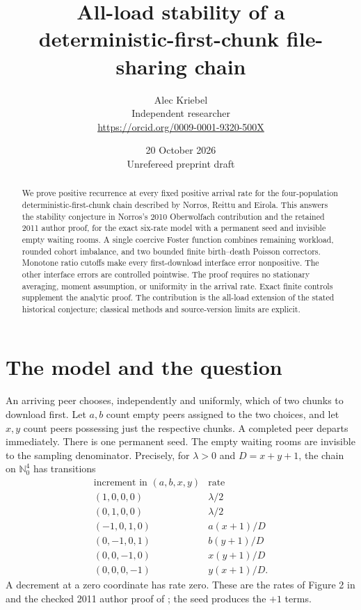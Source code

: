 \documentclass[11pt]{article}
\title{All-load stability of a deterministic-first-chunk file-sharing chain}
\author{Alec Kriebel\\Independent researcher\\
\small\url{https://orcid.org/0009-0001-9320-500X}}
\date{20 October 2026\\\small Unrefereed preprint draft}
\newcommand{\N}{\mathbb N_0}
\begin{document}
\maketitle
\begin{abstract}
We prove positive recurrence at every fixed positive arrival rate for the
four-population deterministic-first-chunk chain described by Norros, Reittu
and Eirola. This answers the stability conjecture in Norros's 2010
Oberwolfach contribution and the retained 2011 author proof, for the exact
six-rate model with a permanent seed and invisible empty waiting rooms.
A single coercive Foster function combines remaining workload, rounded
cohort imbalance, and two bounded finite birth--death Poisson correctors.
Monotone ratio cutoffs make every first-download interface error
nonpositive. The other interface errors are controlled pointwise.
The proof requires no stationary averaging, moment assumption, or
uniformity in the arrival rate. Exact finite controls supplement the
analytic proof. The contribution is the all-load extension of the stated historical
conjecture; classical methods and source-version limits are explicit.
\end{abstract}

\section{The model and the question}

An arriving peer chooses, independently and uniformly, which of two
chunks to download first. Let $a,b$ count empty peers assigned to the two
choices, and let $x,y$ count peers possessing just the respective chunks.
A completed peer departs immediately. There is one permanent seed.
The empty waiting rooms are invisible to the sampling denominator.
Precisely, for $\lambda>0$ and $D=x+y+1$, the chain on $\N^4$ has transitions
\[
\begin{array}{c|c}
\text{increment in }(a,b,x,y)&\text{rate}\\ \hline
(1,0,0,0)&\lambda/2\\
(0,1,0,0)&\lambda/2\\
(-1,0,1,0)&a(x+1)/D\\
(0,-1,0,1)&b(y+1)/D\\
(0,0,-1,0)&x(y+1)/D\\
(0,0,0,-1)&y(x+1)/D .
\end{array}                                                    \tag{1}
\]
A decrement at a zero coordinate has rate zero. These are the rates of
Figure 2 in \cite{NRE09} and the checked 2011 author proof of
\cite{NRE11}; the seed produces the $+1$ terms.
\end{document}
